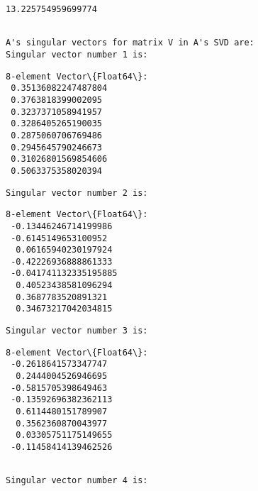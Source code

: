 \documentclass[11pt]{article}
\begin{document}
    
    \begin{Verbatim}[commandchars=\\\{\}]
13.225754959699774
    \end{Verbatim}

    
    \begin{Verbatim}[commandchars=\\\{\}]

A's singular vectors for matrix V in A's SVD are:
Singular vector number 1 is:
    \end{Verbatim}

    
    \begin{Verbatim}[commandchars=\\\{\}]
8-element Vector\{Float64\}:
 0.35136082247487804
 0.3763818399002095
 0.3237371058941957
 0.3286405265190035
 0.2875060706769486
 0.2945645790246673
 0.31026801569854606
 0.5063375358020394
    \end{Verbatim}

    
    \begin{Verbatim}[commandchars=\\\{\}]
Singular vector number 2 is:
    \end{Verbatim}

    
    \begin{Verbatim}[commandchars=\\\{\}]
8-element Vector\{Float64\}:
 -0.13446246714199986
 -0.6145149653100952
  0.06165940230197924
 -0.42226936888861333
 -0.041741132335195885
  0.40523438581096294
  0.3687783520891321
  0.34673217042034815
    \end{Verbatim}

    
    \begin{Verbatim}[commandchars=\\\{\}]
Singular vector number 3 is:
    \end{Verbatim}

    
    \begin{Verbatim}[commandchars=\\\{\}]
8-element Vector\{Float64\}:
 -0.2618641573347747
  0.2444004526946695
 -0.5815705398649463
 -0.13592696382362113
  0.6114480151789907
  0.3562360870043977
  0.03305751175149655
 -0.11458414139462526
    \end{Verbatim}

    
    \begin{Verbatim}[commandchars=\\\{\}]

Singular vector number 4 is:
    \end{Verbatim}
\end{document}
